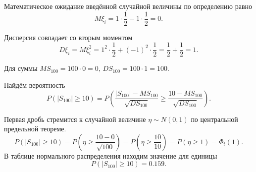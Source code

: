 Математическое ожидание введённой случайной величины по определению равно
$$M \xi_i =
  1 \cdot \frac{1}{2} - 1 \cdot \frac{1}{2} =
  0.$$

Дисперсия совпадает со вторым моментом
$$D \xi_i =
  M \xi_i^2 =
  1^2 \cdot \frac{1}{2} + \left( -1 \right)^2 \cdot \frac{1}{2} =
  \frac{1}{2} + \frac{1}{2} =
  1.$$

Для суммы $MS_{100} = 100 \cdot 0 = 0, \, DS_{100} = 100 \cdot 1 = 100$.

Найдём вероятность
$$P \left( \left| S_{100} \right| \geq 10 \right) =
  P \left(
    \frac{ \left| S_{100} \right| - MS_{100}}{ \sqrt{DS_{100}}} \geq
    \frac{10 - MS_{100}}{ \sqrt{DS_{100}}}
  \right).$$

Первая дробь стремится к случайной величине $ \eta \sim N \left( 0, 1 \right) $
по центральной предельной теореме.
$$P \left( \left| S_{100} \right| \geq 10 \right) =
  P \left( \eta \geq \frac{10 - 0}{ \sqrt{100}} \right) =
  P \left( \eta \geq \frac{10}{10} \right) =
  P \left( \eta \geq 1 \right) =
  \Phi_t \left( 1 \right).$$
В таблице нормального распределения находим значение для единицы
$$P \left( \left| S_{100} \right| \geq 10 \right) =
  0.159.$$
